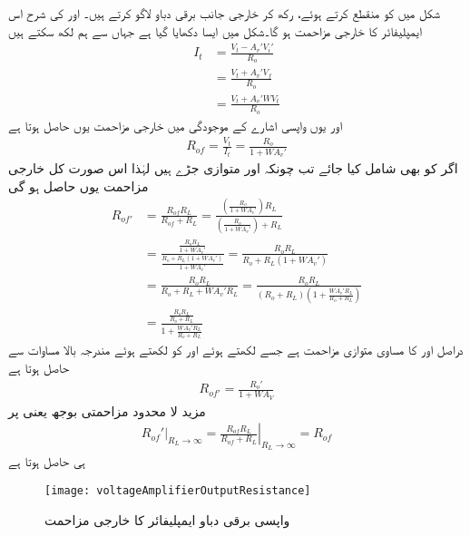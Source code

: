 شکل  میں  کو منقطع کرتے ہوئے،  رکھ  کر خارجی جانب برقی دباو  لاگو کرتے ہیں۔ اور  کی شرح اس ایمپلیفائر کا خارجی مزاحمت  ہو گا۔شکل  میں ایسا دکھایا گیا ہے جہاں سے ہم لکھ سکتے ہیں
\begin{align*}
I_t&=\frac{V_t-A_v' V_i'}{R_o}\\
&=\frac{V_t +A_v' V_f}{R_o} \\
&=\frac{V_t+A_v' W V_t}{R_o}
\end{align*}
اور یوں واپسی اشارے کے موجودگی میں خارجی مزاحمت یوں حاصل ہوتا ہے
\begin{align}
R_{of}=\frac{V_t}{I_t}=\frac{R_o}{1+W A_v'}
\end{align}
اگر  کو بھی شامل کیا جائے تب چونکہ  اور   متوازی جڑے ہیں لہٰذا اس صورت کل خارجی مزاحمت  یوں حاصل ہو گی
\begin{align*}
R_{of'}&=\frac{R_{of} R_L}{R_{of}+R_L}=\frac{\left (\frac{R_o}{1+W A_v'}\right ) R_L} {\left (\frac{R_o}{1+W A_v'} \right )+R_L}\\
&=\frac{\frac{R_o R_L}{1+W A_v'}}{\frac{R_o+R_L \left (1+W A_v' \right )}{1+W A_v'}}=\frac{R_o R_L}{R_o +R_L \left ( 1+W A_v'\right )}\\
&=\frac{R_o R_L}{R_o +R_L + W A_v' R_L}=\frac{R_o R_L}{\left (R_o +R_L \right ) \left (1 + \frac{W A_v' R_L}{R_o+R_L} \right )}\\
&=\frac{\frac{R_o R_L}{R_o+R_L}}{1+\frac{W A_v' R_L}{R_o+R_L}}
\end{align*}
 دراصل  اور  کا مساوی متوازی مزاحمت ہے جسے  لکھتے ہوئے اور  کو  لکھتے ہوئے مندرجہ بالا مساوات سے حاصل ہوتا ہے
\begin{align}
R_{of'}=\frac{R_o'}{1+W A_V}
\end{align}
مزید لا محدود مزاحمتی بوجھ یعنی  پر
\begin{align} \label{مساوات_واپسی_لامحدود_بار_مزاحمت__پر_مزاحمت}
\left. R_{of}' \right|_{R_L \to \infty}=\left. \frac{R_{of} R_L}{R_{of}+R_L} \right|_{R_L \to \infty} = R_{of}
\end{align}
ہی حاصل ہوتا ہے
\begin{figure}
\centering
\texttt{[image: voltageAmplifierOutputResistance]}
\caption{واپسی برقی دباو ایمپلیفائر کا خارجی مزاحمت}
\label{شکل_واپسی_برقی_دباو_ایمپلیفائر_خارجی_مزاحمت}
\end{figure}
